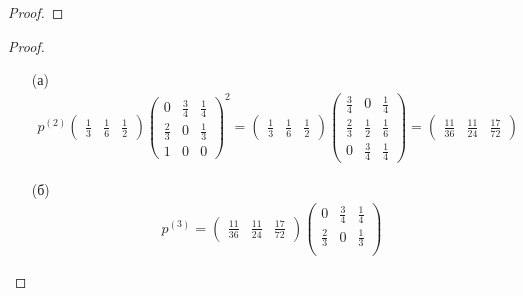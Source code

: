     \begin{prob}
    \end{prob}
    \begin{proof}
    \end{proof}
\vskip 0.6in


    \begin{prob}
    \end{prob}
    \begin{proof}
    \begin{itemize}
    \item[(а)]
        \begin{gather*}
            p^{(2)}
            \begin{pmatrix}
                \frac{1}{3} & \frac{1}{6} & \frac{1}{2}
            \end{pmatrix}
            \begin{pmatrix}
                0 & \frac{3}{4} & \frac{1}{4}\\
                \frac{2}{3} & 0 & \frac{1}{3}\\
                1 & 0 & 0
            \end{pmatrix}^2
            =
            \begin{pmatrix}
                \frac{1}{3} & \frac{1}{6} & \frac{1}{2}
            \end{pmatrix}
            \begin{pmatrix}
                \frac{3}{4} & 0 & \frac{1}{4}\\
                \frac{2}{3} & \frac{1}{2} & \frac{1}{6}\\
                0 & \frac{3}{4} & \frac{1}{4}
            \end{pmatrix}
            = 
            \begin{pmatrix}
                \frac{11}{36} & \frac{11}{24} & \frac{17}{72}
            \end{pmatrix}
        \end{gather*}
    \item[(б)]
        \begin{gather*}
            p^{(3)} =
            \begin{pmatrix}
                \frac{11}{36} & \frac{11}{24} & \frac{17}{72}
            \end{pmatrix}
            \begin{pmatrix}
                0 & \frac{3}{4} & \frac{1}{4}\\
                \frac{2}{3} & 0 & \frac{1}{3}\\

\end{pmatrix}
\end{gather*}
\end{itemize}
\end{proof}
